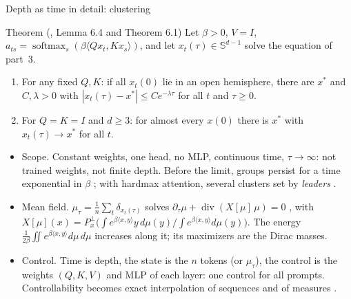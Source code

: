 \documentclass[10pt]{beamer}
\newcommand{\ctrl}[1]{\textcolor{ctrl}{#1}}
\DeclareMathOperator{\softmax}{softmax}
\begin{document}
\begin{frame}{Depth as time in detail: clustering}
\footnotesize
\begin{mathbox}{Theorem (\citet{geshkovski2025}, Lemma 6.4 and Theorem 6.1)}
Let $\beta>0$, $V=I$, $a_{ts}=\softmax_s(\beta\langle Qx_t,Kx_s\rangle)$, and let $x_t(\tau)\in\mathbb S^{d-1}$ solve the equation of part~3.
\begin{enumerate}
\item For any fixed $Q,K$: if all $x_t(0)$ lie in an open hemisphere, there are $x^*$ and $C,\lambda>0$ with $|x_t(\tau)-x^*|\le Ce^{-\lambda\tau}$ for all $t$ and $\tau\ge0$.
\item For $Q=K=I$ and $d\ge3$: for almost every $x(0)$ there is $x^*$ with $x_t(\tau)\to x^*$ for all $t$.
\end{enumerate}
\end{mathbox}
\begin{itemize}
\item \alert{Scope.} Constant weights, one head, no MLP, continuous time, $\tau\to\infty$: not trained weights, not finite depth. Before the limit, groups persist for a time exponential in $\beta$ \citep{geshkovski2024}; with hardmax attention, several clusters set by \emph{leaders} \citep{alcalde2025}.
\item \alert{Mean field.} $\mu_\tau=\frac1n\sum_t\delta_{x_t(\tau)}$ solves $\partial_\tau\mu+\operatorname{div}(X[\mu]\,\mu)=0$ \citep{sander2022}, with $X[\mu](x)=P^\perp_x\big(\int e^{\beta\langle x,y\rangle}y\,d\mu(y)\big/\!\int e^{\beta\langle x,y\rangle}d\mu(y)\big)$. The energy $\frac1{2\beta}\iint e^{\beta\langle x,y\rangle}d\mu\,d\mu$ increases along it; its maximizers are the Dirac masses.
\item \alert{Control.} Time is depth, the state is the $n$ tokens (or $\mu_\tau$), the \ctrl{control} is the weights $(Q,K,V)$ and MLP of each layer: one control for all prompts. Controllability becomes exact interpolation of sequences and of measures \citep{alcalde2026,geshkovski2026}.
\end{itemize}
\end{frame}
\end{document}
